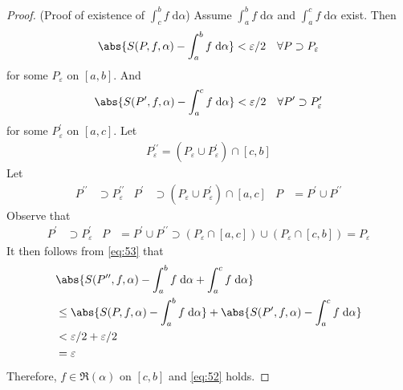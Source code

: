 \documentclass[thmcnt=section, 12pt]{elegantbook}
\begin{document}
\begin{proof}
    \par (Proof of existence of $\int_c^b f \; \mathrm{d}\alpha$) Assume $\int_a^b f \; \mathrm{d}\alpha$ and $\int_a^c f \; \mathrm{d}\alpha$ exist. Then 
    \begin{align*}
        \abs{S(P, f, \alpha) - \int_a^b f \; \mathrm{d}\alpha} < \varepsilon / 2
        \quad \forall P \supset P_\varepsilon
    \end{align*}
    for some $P_\varepsilon$ on $[a, b]$. And
    \begin{align*}
        \abs{S(P^\prime, f, \alpha) - \int_a^c f \; \mathrm{d}\alpha} < \varepsilon / 2
        \quad \forall P^\prime \supset P_\varepsilon^\prime
    \end{align*}
    for some $P_\varepsilon^\prime$ on $[a, c]$.
    Let
    \begin{align*}
        P_\varepsilon^{\prime\prime} = (P_\varepsilon \cup P_\varepsilon^\prime) \cap [c, b]
    \end{align*}
    Let
    \begin{align*}
        P^{\prime\prime} &\supset P_\varepsilon^{\prime\prime} &
        P^\prime &\supset (P_\varepsilon \cup P_\varepsilon^\prime) \cap [a, c] &
        P &= P^\prime \cup P^{\prime\prime}
    \end{align*} 
    Observe that 
    \begin{align*}
        P^\prime &\supset P_\varepsilon^\prime &
        P &= P^\prime \cup P^{\prime\prime}
        \supset (P_\varepsilon \cap [a, c]) \cup (P_\varepsilon \cap [c, b])
        = P_\varepsilon
    \end{align*}
    It then follows from \eqref{eq:53} that
    \begin{align*}
        &\abs{
            S(P^{\prime\prime}, f, \alpha)
            - \int_a^b f \; \mathrm{d}\alpha
            + \int_a^c f \; \mathrm{d}\alpha 
        } \\ 
        &\leq \abs{
            S(P, f, \alpha)
            - \int_a^b f \; \mathrm{d}\alpha
        } + \abs{
            S(P^\prime, f, \alpha)
            - \int_a^c f \; \mathrm{d}\alpha
        } \\ 
        &< \varepsilon / 2 + \varepsilon / 2 \\ 
        &= \varepsilon
    \end{align*} 
    Therefore, $f \in \mathfrak{R}(\alpha)$ on $[c, b]$ and \eqref{eq:52} holds.




\end{proof}
\end{document}
